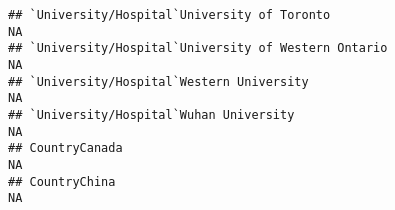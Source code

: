 \documentclass[]{article}
\begin{document}
\begin{verbatim}
## `University/Hospital`University of Toronto                                                                                                                                                                                                                                                                                                                                                                                                                                              NA
## `University/Hospital`University of Western Ontario                                                                                                                                                                                                                                                                                                                                                                                                                                      NA
## `University/Hospital`Western University                                                                                                                                                                                                                                                                                                                                                                                                                                                 NA
## `University/Hospital`Wuhan University                                                                                                                                                                                                                                                                                                                                                                                                                                                   NA
## CountryCanada                                                                                                                                                                                                                                                                                                                                                                                                                                                                           NA
## CountryChina                                                                                                                                                                                                                                                                                                                                                                                                                                                                            NA

\end{verbatim}
\end{document}
